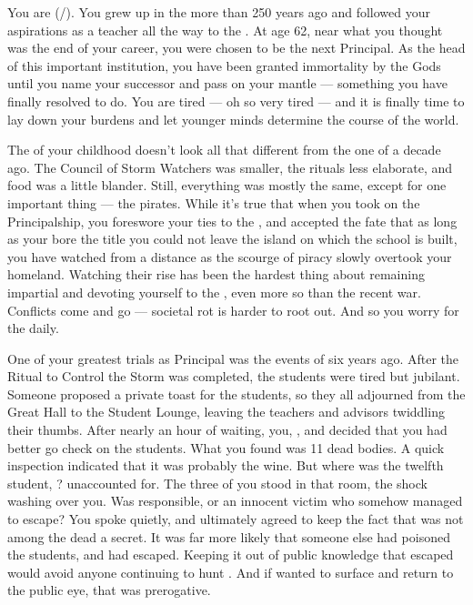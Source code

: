 \documentclass[char]{GL2020}
\begin{document}
\name{\cPrincipal{}}

You are \cPrincipal{\full} (\cPrincipal{\they}/\cPrincipal{\them}). You grew up in the \pShip{} more than 250 years ago and followed your aspirations as a teacher all the way to the \pSchool{}. At age 62, near what you thought was the end of your career, you were chosen to be the next Principal. As the head of this important institution, you have been granted immortality by the Gods until you name your successor and pass on your mantle — something you have finally resolved to do. You are tired — oh so very tired — and it is finally time to lay down your burdens and let younger minds determine the course of the world.

The \pShip{} of your childhood doesn't look all that different from the one of a decade ago. The Council of Storm Watchers was smaller, the rituals less elaborate, and food was a little blander. Still, everything was mostly the same, except for one important thing — the pirates. While it's true that when you took on the Principalship, you foreswore your ties to the \pShippies{}, and accepted the fate that as long as your bore the title you could not leave the island on which the school is built, you have watched from a distance as the scourge of piracy slowly overtook your homeland. Watching their rise has been the hardest thing about remaining impartial and devoting yourself to the \pSc{}, even more so than the recent war. Conflicts come and go — societal rot is harder to root out. And so you worry for the \pShip{} daily.

One of your greatest trials as Principal was the events of six years ago. After the Ritual to Control the Storm was completed, the students were tired but jubilant. Someone proposed a private toast for the students, so they all adjourned from the Great Hall to the Student Lounge, leaving the teachers and advisors twiddling their thumbs. After nearly an hour of waiting, you, \cDiplomat{\full}, and \cMusic{\full} decided that you had better go check on the students. What you found was 11 dead bodies. A quick inspection indicated that it was probably the wine. But where was the twelfth student, \cKidScientist{\full}? \cKidScientist{\They} \cKidScientist{\were} unaccounted for. The three of you stood in that room, the shock washing over you. Was \cKidScientist{} responsible, or \cKidScientist{\were} \cKidScientist{\they} an innocent victim who somehow managed to escape? You spoke quietly, and ultimately agreed to keep the fact that \cKidScientist{} was not among the dead a secret. It was far more likely that someone else had poisoned the students, and \cKidScientist{} had escaped. Keeping it out of public knowledge that \cKidScientist{\they} escaped would avoid anyone continuing to hunt \cKidScientist{\them}. And if \cKidScientist{\they} wanted to surface and return to the public eye, that was \cKidScientist{\their} prerogative.
\end{document}
